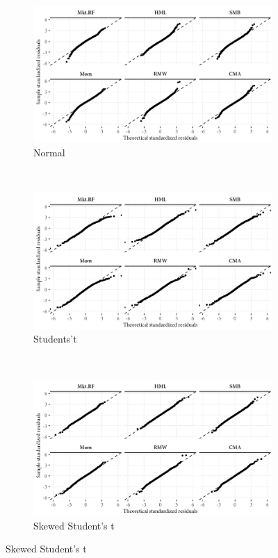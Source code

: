 \begin{figure}[!pt]
  \centering

  \begin{subfigure}{0.70\textwidth}
    \includegraphics[width=\textwidth]{graphics/qq_norm.png}
    \caption{Normal}
  \end{subfigure}
  \\
  \begin{subfigure}{0.70\textwidth}
    \includegraphics[width=\textwidth]{graphics/qq_std.png}
    \caption{Students't}
  \end{subfigure}
  \\
  \begin{subfigure}{0.70\textwidth}
    \includegraphics[width=\textwidth]{graphics/qq_ghst.png}
    \caption{Skewed Student's t}
  \end{subfigure}


\end{figure}
